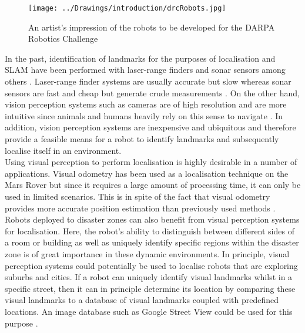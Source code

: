 \begin{figure}[h!] 
  \centering
    \texttt{[image: ../Drawings/introduction/drcRobots.jpg]}
    \caption{An artist's impression of the robots to be developed for the DARPA Robotics Challenge \citep{darpa2012}}
    \label{fig:darpa}
\end{figure}

In the past, identification of landmarks for the purposes of localisation and SLAM have been performed with laser-range finders and sonar sensors among others \citep{Davison2007}. Laser-range finder systems are usually accurate but slow whereas sonar sensors are fast and cheap but generate crude measurements \citep{Se2002}. On the other hand, vision perception systems such as cameras are of high resolution and are more intuitive since animals and humans heavily rely on this sense to navigate \citep{Davison2007}. In addition, vision perception systems are inexpensive and ubiquitous and therefore provide a feasible means for a robot to identify landmarks and subsequently localise itself in an environment.\\

Using visual perception to perform localisation is highly desirable in a number of applications. Visual odometry has been used as a localisation technique on the Mars Rover \citep{Di2008} but since it requires a large amount of processing time, it can only be used in limited scenarios. This is in spite of the fact that visual odometry provides more accurate position estimation than previously used methods \citep{Powell2006}. Robots deployed to disaster zones can also benefit from visual perception systems for localisation. Here, the robot's ability to distinguish between different sides of a room or building as well as uniquely identify specific regions within the disaster zone is of great importance in these dynamic environments. In principle, visual perception systems could potentially be used to localise robots that are exploring suburbs and cities. If a robot can uniquely identify visual landmarks whilst in a specific street, then it can in principle determine its location by comparing these visual landmarks to a database of visual landmarks coupled with predefined locations. An image database such as Google Street View could be used for this purpose \citep{StreetView}.\\

